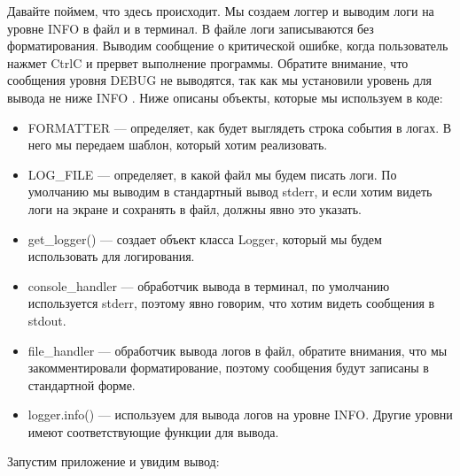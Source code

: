 \documentclass[letterpaper,10pt,russian]{sphinxmanual}
\begin{document}
\sphinxAtStartPar
Давайте поймем, что здесь происходит. Мы создаем логгер и выводим логи на уровне INFO в файл и в терминал. В файле логи записываются без форматирования. Выводим сообщение о критической ошибке, когда пользователь нажмет Ctrl\sphinxhyphen{}C и прервет выполнение программы. Обратите внимание, что сообщения уровня DEBUG не выводятся, так как мы установили уровень для вывода не ниже INFO . Ниже описаны объекты, которые мы используем в коде:
\begin{itemize}
\item {} 
\sphinxAtStartPar
FORMATTER — определяет, как будет выглядеть строка события в логах. В него мы передаем шаблон, который хотим реализовать.

\item {} 
\sphinxAtStartPar
LOG\_FILE — определяет, в какой файл мы будем писать логи. По умолчанию мы выводим в стандартный вывод stderr, и если хотим видеть логи на экране и сохранять в файл, должны явно это указать.

\item {} 
\sphinxAtStartPar
get\_logger() — создает объект класса Logger, который мы будем использовать для логирования.

\item {} 
\sphinxAtStartPar
console\_handler — обработчик вывода в терминал, по умолчанию используется stderr, поэтому явно говорим, что хотим видеть сообщения в stdout.

\item {} 
\sphinxAtStartPar
file\_handler — обработчик вывода логов в файл, обратите внимания, что мы закомментировали форматирование, поэтому сообщения будут записаны в стандартной форме.

\item {} 
\sphinxAtStartPar
logger.info() — используем для вывода логов на уровне INFO. Другие уровни имеют соответствующие функции для вывода.

\end{itemize}

\sphinxAtStartPar
Запустим приложение и увидим вывод:
\end{document}
